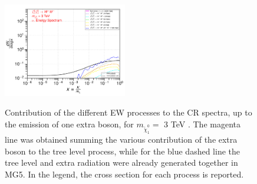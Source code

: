 \documentclass[epj,nopacs,fleqn]{svjour}
\begin{document}
\begin{figure}[!h]
	\subfigure
	{\includegraphics[width=0.48\textwidth]{Fig/n1ww_comparison/3000.0_neutrinos_tau_n1ww_comparison_3000.0.pdf} }
	
	\caption{Contribution of the different EW processes to the CR spectra, up to the emission of one extra boson, for $m_{\tilde \chi_1 ^0}=$ 3 TeV . The magenta line was obtained summing the various contribution of the extra boson to the tree level process, while for the blue dashed line the tree level and extra radiation were already generated together in MG5. In the legend, the cross section for each process is reported.}
	\label{ew_comparison_2}
\end{figure}
\end{document}
